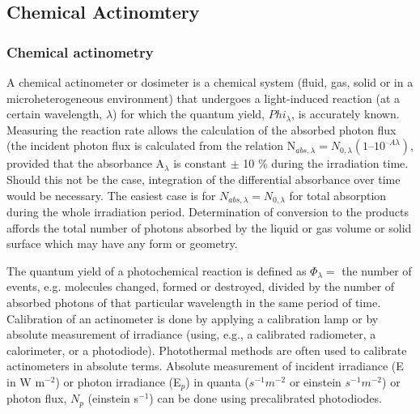 \documentclass[a4paper,12pt,titlepage]{article}
\begin{document}
\subsection{Chemical Actinomtery}
\begin{frame}
\frametitle{Chemical actinometry}
A chemical actinometer or dosimeter is a chemical system (fluid, gas, solid or in a microheterogeneous
environment) that undergoes a light-induced reaction (at a certain wavelength, \(\lambda\)) for which the quantum yield, \(Phi_\lambda\), is accurately known. Measuring the reaction rate allows the calculation of the absorbed photon flux (the incident photon flux is calculated from the relation N\(_{abs,\lambda} = N_{0,\lambda} (1 – 10^{–A\lambda})\), provided that the absorbance A\(_\lambda\) is constant \(\pm\) 10 \% during the irradiation time. Should this not be the case, integration of the differential absorbance over time would be necessary. The easiest case is for \(N_{abs,\lambda} = N_{0,\lambda}\) for total absorption during the whole irradiation period. Determination of conversion to the products affords the total number of photons absorbed by the liquid or gas volume or solid surface which may have any form or geometry.
\end{frame}

 The quantum yield of a photochemical reaction is defined as \(\Phi_\lambda =\) the number of events, e.g. molecules
changed, formed or destroyed, divided by the number of absorbed photons of that particular wavelength in the same
period of time.
 Calibration of an actinometer is done by applying a calibration lamp or by absolute measurement of irradiance
(using, e.g., a calibrated radiometer, a calorimeter, or a photodiode). Photothermal methods are often used to calibrate
actinometers in absolute terms.
 Absolute measurement of incident irradiance (E in W m\(^{-2}\)) or photon irradiance (E\(_p\)) in quanta (\(s^{-1} m^{-2}\) or einstein \(s^{-1} m^{-2}\)) or photon flux, \(N_p\) (einstein s\(^{-1}\)) can be done using precalibrated photodiodes. 


\end{document}
